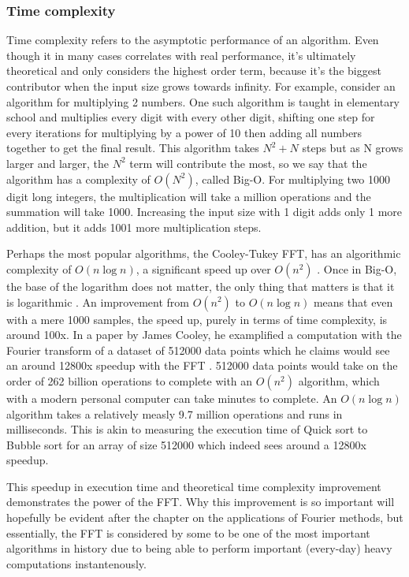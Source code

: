 \subsubsection{Time complexity}
Time complexity refers to the asymptotic performance of an algorithm. Even though it in many cases correlates with real performance, it's ultimately theoretical and only considers the highest order term, because it's the biggest contributor when the input size grows towards infinity. For example, consider an algorithm for multiplying 2 numbers. One such algorithm is taught in elementary school and multiplies every digit with every other digit, shifting one step for every iterations for multiplying by a power of 10 then adding all numbers together to get the final result. This algorithm takes $N^2+N$ steps but as N grows larger and larger, the $N^2$ term will contribute the most, so we say that the algorithm has a complexity of $O(N^2)$, called Big-O. For multiplying two 1000 digit long integers, the multiplication will take a million operations and the summation will take 1000. Increasing the input size with 1 digit adds only 1 more addition, but it adds 1001 more multiplication steps.

Perhaps the most popular algorithms, the Cooley-Tukey FFT, has an algorithmic complexity of $O(n \log n)$, a significant speed up over $O(n^2)$ \cite{Randhawa2018} \cite{HeidemanEtAl1984}. Once in Big-O, the base of the logarithm does not matter, the only thing that matters is that it is logarithmic . An improvement from $O(n^2)$ to $O(n \log n)$ means that even with a mere 1000 samples, the speed up, purely in terms of time complexity, is around 100x. In a paper by James Cooley, he examplified a computation with the Fourier transform of a dataset of 512000 data points which he claims would see an around 12800x speedup with the FFT \cite{Cooley1987}. 512000 data points would take on the order of 262 billion operations to complete with an $O(n^2)$ algorithm, which with a modern personal computer can take minutes to complete. An $O(n \log n)$ algorithm takes a relatively measly 9.7 million operations and runs in milliseconds. This is akin to measuring the execution time of Quick sort to Bubble sort for an array of size 512000 which indeed sees around a 12800x speedup.

This speedup in execution time and theoretical time complexity improvement demonstrates the power of the FFT. Why this improvement is so important will hopefully be evident after the chapter on the applications of Fourier methods, but essentially, the FFT is considered by some  to be one of the most important algorithms in history due to being able to perform important (every-day) heavy computations instantenously. 

